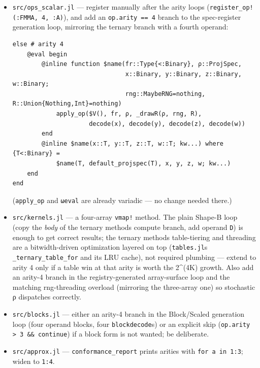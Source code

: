 \begin{itemize}
\item[1. ] \texttt{src/ops\_scalar.jl} — register manually after the arity loops (\texttt{register\_op!(:FMMA, 4, :A)}), and add an \texttt{op.arity == 4} branch to the spec-register generation loop, mirroring the ternary branch with a fourth operand:


\begin{verbatim}
else # arity 4
    @eval begin
        @inline function $name(fr::Type{<:Binary}, ρ::ProjSpec,
                               x::Binary, y::Binary, z::Binary, w::Binary;
                               rng::MaybeRNG=nothing, R::Union{Nothing,Int}=nothing)
            apply_op($V(), fr, ρ, _drawR(ρ, rng, R),
                     decode(x), decode(y), decode(z), decode(w))
        end
        @inline $name(x::T, y::T, z::T, w::T; kw...) where {T<:Binary} =
            $name(T, default_projspec(T), x, y, z, w; kw...)
    end
end
\end{verbatim}

(\texttt{apply\_op} and \texttt{ωeval} are already variadic — no change needed there.)


\item[2. ] \texttt{src/kernels.jl} — a four-array \texttt{vmap!} method. The plain Shape-B loop (copy the \emph{body} of the ternary method{\textquotesingle}s compute branch, add operand \texttt{D}) is enough to get correct results; the ternary method{\textquotesingle}s table-tiering and threading are a bitwidth-driven optimization layered on top (\texttt{tables.jl}{\textquotesingle}s \texttt{\_ternary\_table\_for} and its LRU cache), not required plumbing — extend to arity 4 only if a table win at that arity is worth the 2{\textasciicircum}(4K) growth. Also add an arity-4 branch in the registry-generated array-surface loop and the matching rng-threading overload (mirroring the three-array one) so stochastic ρ dispatches correctly.


\item[3. ] \texttt{src/blocks.jl} — either an arity-4 branch in the Block/Scaled generation loop (four operand blocks, four \texttt{blockdecode}s) or an explicit skip (\texttt{op.arity > 3 \&\& continue}) if a block form is not wanted; be deliberate.


\item[4. ] \texttt{src/approx.jl} — \texttt{conformance\_report} prints arities with \texttt{for a in 1:3}; widen to \texttt{1:4}.

\end{itemize}


